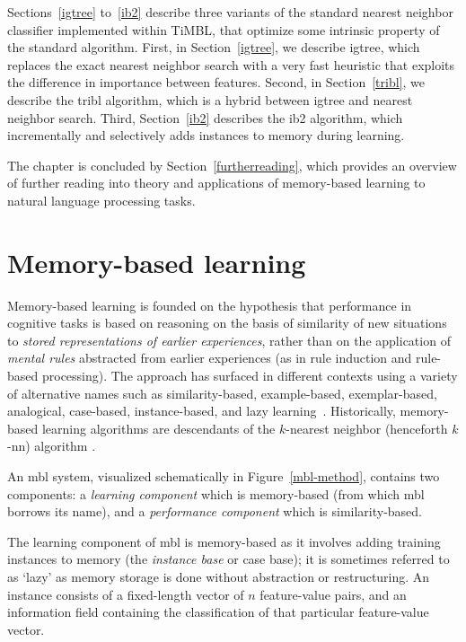 \documentclass{report}
\begin{document}
Sections~\ref{igtree} to~\ref{ib2} describe three variants of the
standard nearest neighbor classifier implemented within TiMBL, that
optimize some intrinsic property of the standard algorithm. First, in
Section~\ref{igtree}, we describe {\sc igtree}, which replaces the
exact nearest neighbor search with a very fast heuristic that exploits
the difference in importance between features. Second, in
Section~\ref{tribl}, we describe the {\sc tribl} algorithm, which is a
hybrid between {\sc igtree} and nearest neighbor search. Third,
Section~\ref{ib2} describes the {\sc ib2} algorithm, which
incrementally and selectively adds instances to memory during
learning.

The chapter is concluded by Section~\ref{furtherreading}, which
provides an overview of further reading into theory and applications
of memory-based learning to natural language processing tasks.

\section{Memory-based learning}
\label{mbl}

Memory-based learning is founded on the hypothesis that performance in
cognitive tasks is based on reasoning on the basis of similarity of
new situations to {\em stored representations of earlier experiences},
rather than on the application of {\em mental rules}\/ abstracted from
earlier experiences (as in rule induction and rule-based processing).
The approach has surfaced in different contexts using a variety of
alternative names such as similarity-based, example-based,
exemplar-based, analogical, case-based, in\-stance-based, and lazy
learning~\cite{Stanfill+86,Cost+93,Kolodner93,Aha+91,Aha97a}.
Historically, memory-based learning algorithms are descendants of the
$k$-nearest neighbor (henceforth $k$-{\sc nn}) algorithm
\cite{Cover+67,Devijver+82,Aha+91}.

An {\sc mbl} system, visualized schematically in
Figure~\ref{mbl-method}, contains two components: a {\em learning
component}\/ which is memory-based (from which {\sc mbl} borrows its
name), and a {\em performance component}\/ which is similarity-based.

The learning component of {\sc mbl} is memory-based as it involves
adding training instances to memory (the {\em instance base} or case
base); it is sometimes referred to as `lazy' as memory storage is done
without abstraction or restructuring.  An instance consists of a
fixed-length vector of $n$ feature-value pairs, and an information
field containing the classification of that particular feature-value
vector.  
\end{document}
